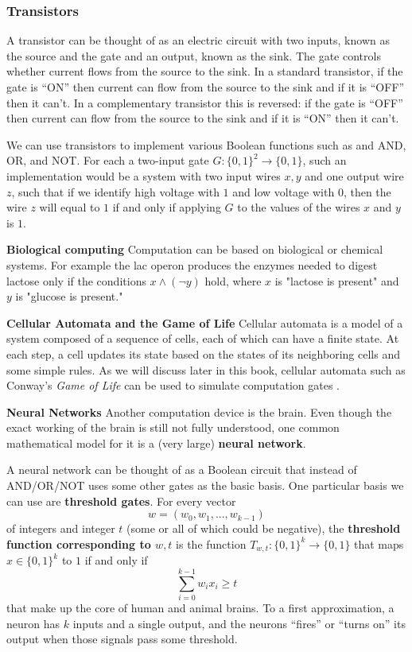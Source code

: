 \documentclass[a4paper, 12pt]{report}
\theoremstyle{remark}
\theoremstyle{definition}
\begin{document}
\subsubsection{Transistors}
A transistor can be thought of as an electric circuit with two inputs, known as the source and the gate and an output, known as the sink. The gate controls whether current flows from the source to the sink. In a standard transistor, if the gate is “ON” then current can flow from the source to the sink and if it is “OFF” then it can’t. In a complementary transistor this is reversed: if the gate is “OFF” then current can flow from the source to the sink and if it is “ON” then it can’t. 

We can use transistors to implement various Boolean functions such as and AND, OR, and NOT. For each a two-input gate $G: \{0,1\}^2 \longrightarrow \{0,1\}$, such an implementation would be a system with two input wires $x, y$ and one output wire $z$, such that if we identify high voltage with $1$ and low voltage with $0$, then the wire $z$ will equal to $1$ if and only if applying $G$ to the values of the wires $x$ and $y$ is $1$. 

\textbf{Biological computing} Computation can be based on biological or chemical systems. For example the lac operon produces the enzymes needed to digest lactose only if the conditions $x \wedge (\lnot y)$ hold, where $x$ is "lactose is present" and $y$ is "glucose is present." 


\textbf{Cellular Automata and the Game of Life} Cellular automata is a model of a system composed of a sequence of cells, each of which can have a finite state. At each step, a cell updates its state based on the states of its neighboring cells and some simple rules. As we will discuss later in this book, cellular automata such as Conway’s \textit{Game of Life} can be used to simulate computation gates .

\textbf{Neural Networks} Another computation device is the brain. Even though the exact working of the brain is still not fully understood, one common mathematical model for it is a (very large) \textbf{neural network}. 

A neural network can be thought of as a Boolean circuit that instead of AND/OR/NOT uses some other gates as the basic basis. One particular basis we can use are \textbf{threshold gates}. For every vector
\[w = (w_0, w_1, ..., w_{k-1})\]
of integers and integer $t$ (some or all of which could be negative), the \textbf{threshold function corresponding to $w, t$} is the function $T_{w, t} :\{0,1\}^k \longrightarrow \{0,1\}$ that maps $x \in \{0,1\}^k$ to $1$ if and only if
\[\sum_{i=0}^{k-1} w_i x_i \geq t\]
that make up the core of human and animal brains. To a first approximation, a neuron has $k$ inputs and a single output, and the neurons “fires” or “turns on” its output when those signals pass some threshold. 
\end{document}
